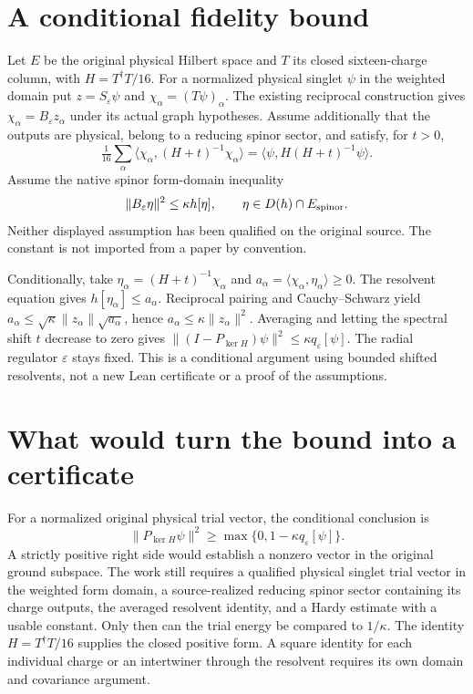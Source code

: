 \section{A conditional fidelity bound}
\label{sec:ed08-resolvent}
Let $E$ be the original physical Hilbert space and $T$ its closed
sixteen-charge column, with $H=T^\dagger T/16$. For a normalized
physical singlet $\psi$ in the weighted domain put
$z=S_\varepsilon\psi$ and $\chi_\alpha=(T\psi)_\alpha$.
The existing reciprocal construction gives
$\chi_\alpha=B_\varepsilon z_\alpha$ under its actual graph
hypotheses. Assume additionally that the outputs are physical,
belong to a reducing spinor sector, and satisfy, for $t>0$,
\begin{equation}\label{eq:ed08-R}
 \tfrac1{16}\sum_\alpha
 \langle\chi_\alpha,(H+t)^{-1}\chi_\alpha\rangle
 =\langle\psi,H(H+t)^{-1}\psi\rangle.
\end{equation}
Assume the native spinor form-domain inequality
\begin{equation}\label{eq:ed08-Hardy}
 \|B_\varepsilon\eta\|^2\leq\kappa h[\eta],
 \qquad \eta\in D(h)\cap E_{\rm spinor}.
\end{equation}
Neither displayed assumption has been qualified on the original
source. The constant is not imported from a paper by convention.

Conditionally, take $\eta_\alpha=(H+t)^{-1}\chi_\alpha$ and
$a_\alpha=\langle\chi_\alpha,\eta_\alpha\rangle\geq0$.
The resolvent equation gives $h[\eta_\alpha]\leq a_\alpha$.
Reciprocal pairing and Cauchy--Schwarz yield
$a_\alpha\leq\sqrt\kappa\|z_\alpha\|\sqrt{a_\alpha}$,
hence $a_\alpha\leq\kappa\|z_\alpha\|^2$. Averaging and
letting the spectral shift $t$ decrease to zero gives
$\|(I-P_{\ker H})\psi\|^2\leq\kappa q_\varepsilon[\psi]$.
The radial regulator $\varepsilon$ stays fixed. This is a conditional
argument using bounded shifted resolvents, not a new Lean certificate
or a proof of the assumptions.


\section{What would turn the bound into a certificate}
For a normalized original physical trial vector, the conditional
conclusion is
\[
 \|P_{\ker H}\psi\|^2\geq\max\{0,1-\kappa q_\varepsilon[\psi]\}.
\]
A strictly positive right side would establish a nonzero vector in
the original ground subspace. The work still requires a qualified
physical singlet trial vector in the weighted form domain, a
source-realized reducing spinor sector containing its charge outputs,
the averaged resolvent identity, and a Hardy estimate with a usable
constant. Only then can the trial energy be compared to $1/\kappa$.
The identity $H=T^\dagger T/16$ supplies the closed positive form.
A square identity for each individual charge or an intertwiner through
the resolvent requires its own domain and covariance argument.
